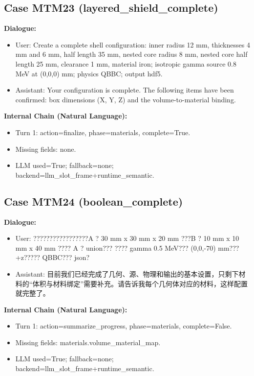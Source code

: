 \documentclass[11pt]{ctexart}
\begin{document}
\subsection{Case MTM23 (layered\_shield\_complete)}
\textbf{Dialogue:}
\begin{itemize}
\item User: Create a complete shell configuration: inner radius 12 mm, thicknesses 4 mm and 6 mm, half length 35 mm, nested core radius 8 mm, nested core half length 25 mm, clearance 1 mm, material iron; isotropic gamma source 0.8 MeV at (0,0,0) mm; physics QBBC; output hdf5.
\item Assistant: Your configuration is complete. The following items have been confirmed: box dimensions (X, Y, Z) and the volume-to-material binding.
\end{itemize}
\textbf{Internal Chain (Natural Language):}
\begin{itemize}
\item Turn 1: action=finalize, phase=materials, complete=True.
\item Missing fields: none.
\item LLM used=True; fallback=none; backend=llm\_slot\_frame+runtime\_semantic.
\end{itemize}
\subsection{Case MTM24 (boolean\_complete)}
\textbf{Dialogue:}
\begin{itemize}
\item User: ?????????????????A ? 30 mm x 30 mm x 20 mm ???B ? 10 mm x 10 mm x 40 mm ???? A ? union??? ???? gamma 0.5 MeV??? (0,0,-70) mm??? +z????? QBBC??? json?
\item Assistant: 目前我们已经完成了几何、源、物理和输出的基本设置，只剩下材料的“体积与材料绑定”需要补充。请告诉我每个几何体对应的材料，这样配置就完整了。
\end{itemize}
\textbf{Internal Chain (Natural Language):}
\begin{itemize}
\item Turn 1: action=summarize\_progress, phase=materials, complete=False.
\item Missing fields: materials.volume\_material\_map.
\item LLM used=True; fallback=none; backend=llm\_slot\_frame+runtime\_semantic.
\end{itemize}
\end{document}
